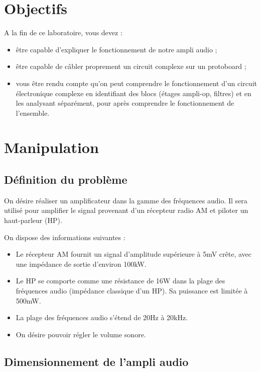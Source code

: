\documentclass{../template/labo}
\begin{document}
\section{Objectifs}
A la fin de ce laboratoire, vous devez  :
\vspace{3mm}
\begin{itemize}
\item être capable d'expliquer le fonctionnement de notre ampli audio ;
\item être capable de câbler proprement un circuit complexe sur un protoboard ;
\item vous être rendu compte qu'on peut comprendre le fonctionnement d'un circuit électronique complexe en identifiant des blocs (étages ampli-op, filtres) et en les analysant séparément, pour après comprendre le fonctionnement de l'ensemble.
\end{itemize}



\section{Manipulation}
\subsection{Définition du problème}
On désire réaliser un amplificateur dans la gamme des fréquences audio. Il sera utilisé pour amplifier le signal provenant d'un récepteur radio AM et piloter un haut-parleur (HP).

On dispose des informations suivantes :
\vspace{3mm}
\begin{itemize}
\item Le récepteur AM fournit un signal d'amplitude supérieure à 5mV crête, avec une impédance de sortie d'environ 100kW.
\item Le HP se comporte comme une résistance de 16W dans la plage des fréquences audio (impédance classique d'un HP). Sa puissance est limitée à 500mW.
\item La plage des fréquences audio s'étend de 20Hz à 20kHz.
\item On désire pouvoir régler le volume sonore.
\end{itemize}


\subsection{Dimensionnement de l'ampli audio}
\label{Dimensionnement}
\end{document}
